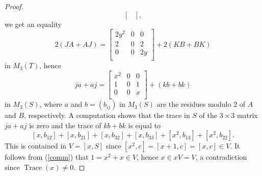 \documentclass[10pt,a4paper]{amsart}
\begin{document}
\begin{proof}
\[\begin{bmatrix}
\end{bmatrix},
\]
we get an equality
\[
2(J A+A J)=\begin{bmatrix}
2{y}^2 &  0  & 0\\
2 &   0 &  2\\
0 &   0 & 2{y} \\
\end{bmatrix}+2(K B+ B K)
\]
in $M_3(T)$, hence
\begin{equation}\label{comm}
ja+ aj=\begin{bmatrix}
{x}^2 &  0  & 0\\
1 &   0 &  1\\
0 &   0 & x \\
\end{bmatrix}+( kb+ bk)
\end{equation}
in $M_3(S)$, where $a$ and $b=(b_{ij})$ in $M_3(S)$ are the residues modulo $2$ of $A$ and $B$, respectively.
A computation shows that the trace
in $S$ of the $3\times 3$ matrix $ja+ aj$ is zero and the trace of $kb+ bk$ is equal to
\[
[x, b_{12}]+[x, b_{21}]+[x, b_{32}]+[x, b_{33}]+[x^2, b_{13}]+[x^2, b_{22}].
\]
This is contained in $V=[x,S]$ since $[x^2,c]=[x+1,c]=[x,c]\in V$. It follows from (\ref{comm})
that $1=x^2+x\in V$, hence $x\in xV=V$, a contradiction since $\operatorname{Trace}(x)\neq 0$.
\end{proof}
\end{document}
